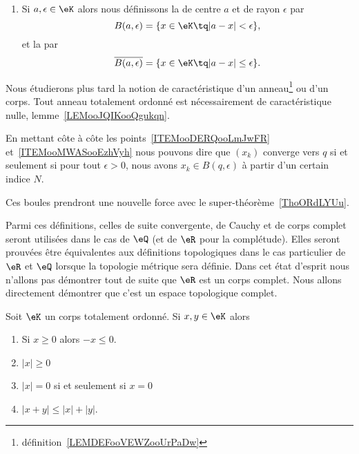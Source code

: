 \begin{definition}
\begin{enumerate}
        \item       \label{ITEMooMWASooEzhVyh}
            Si \( a,\epsilon\in \eK\) alors nous définissons la  de centre \( a\) et de rayon \( \epsilon\) par
            \begin{equation}
                B(a,\epsilon)=\{ x\in \eK\tq | a-x |<\epsilon \},
            \end{equation}
            et la  par
            \begin{equation}
                \overline{ B(a,\epsilon) }=\{ x\in \eK\tq | a-x |\leq \epsilon \}.
            \end{equation}

    \end{enumerate}
\end{definition}

\begin{remark}
    Nous étudierons plus tard la notion de caractéristique d'un anneau\footnote{définition~\ref{LEMDEFooVEWZooUrPaDw}} ou d'un corps. Tout anneau totalement ordonné est nécessairement de caractéristique nulle, lemme~\ref{LEMooJQIKooQgukqn}.
\end{remark}

\begin{remark}
    En mettant côte à côte les points~\ref{ITEMooDERQooLmJwFR} et~\ref{ITEMooMWASooEzhVyh} nous pouvons dire que \( (x_k)\) converge vers \( q\) si et seulement si pour tout \( \epsilon>0\), nous avons \( x_k\in B(q,\epsilon)\) à partir d'un certain indice \( N\).

    Ces boules prendront une nouvelle force avec le super-théorème~\ref{ThoORdLYUu}.
\end{remark}

Parmi ces définitions, celles de suite convergente, de Cauchy et de corps complet seront utilisées dans le cas de \( \eQ\) (et de \( \eR\) pour la complétude). Elles seront prouvées être équivalentes aux définitions topologiques dans le cas particulier de \( \eR\) et \( \eQ\) lorsque la topologie métrique sera définie. Dans cet état d'esprit nous n'allons pas démontrer tout de suite que \( \eR\) est un corps complet. Nous allons directement démontrer que c'est un espace topologique complet.

\begin{lemma}  \label{LemooANTJooYxQZDw}
    Soit \( \eK\) un corps totalement ordonné. Si \( x,y\in \eK\) alors
    \begin{enumerate}
        \item       \label{ItemooNVDIooSuiSoB}
            Si \( x\geq 0\) alors \( -x\leq 0\).
        \item
            \( | x |\geq 0\)
        \item
            \( | x |=0\) si et seulement si \( x=0\)
        \item\label{ItemooOMKNooRlanvk}
            \( | x+y |\leq | x |+| y |\).
    \end{enumerate}
\end{lemma}

